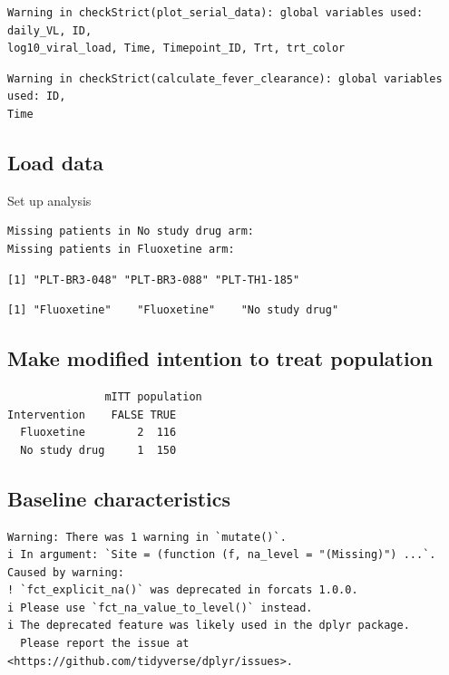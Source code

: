 \documentclass[
  letterpaper,
  DIV=11,
  numbers=noendperiod]{scrartcl}
\begin{document}
\begin{verbatim}
Warning in checkStrict(plot_serial_data): global variables used: daily_VL, ID,
log10_viral_load, Time, Timepoint_ID, Trt, trt_color
\end{verbatim}

\begin{verbatim}
Warning in checkStrict(calculate_fever_clearance): global variables used: ID,
Time
\end{verbatim}

\hypertarget{load-data}{%
\subsection{Load data}\label{load-data}}

Set up analysis

\begin{verbatim}
Missing patients in No study drug arm:
Missing patients in Fluoxetine arm:
\end{verbatim}

\begin{verbatim}
[1] "PLT-BR3-048" "PLT-BR3-088" "PLT-TH1-185"
\end{verbatim}

\begin{verbatim}
[1] "Fluoxetine"    "Fluoxetine"    "No study drug"
\end{verbatim}

\hypertarget{make-modified-intention-to-treat-population}{%
\subsection{Make modified intention to treat
population}\label{make-modified-intention-to-treat-population}}

\begin{verbatim}
               mITT population
Intervention    FALSE TRUE
  Fluoxetine        2  116
  No study drug     1  150
\end{verbatim}

\hypertarget{baseline-characteristics}{%
\subsection{Baseline characteristics}\label{baseline-characteristics}}

\begin{verbatim}
Warning: There was 1 warning in `mutate()`.
i In argument: `Site = (function (f, na_level = "(Missing)") ...`.
Caused by warning:
! `fct_explicit_na()` was deprecated in forcats 1.0.0.
i Please use `fct_na_value_to_level()` instead.
i The deprecated feature was likely used in the dplyr package.
  Please report the issue at <https://github.com/tidyverse/dplyr/issues>.
\end{verbatim}
\end{document}
